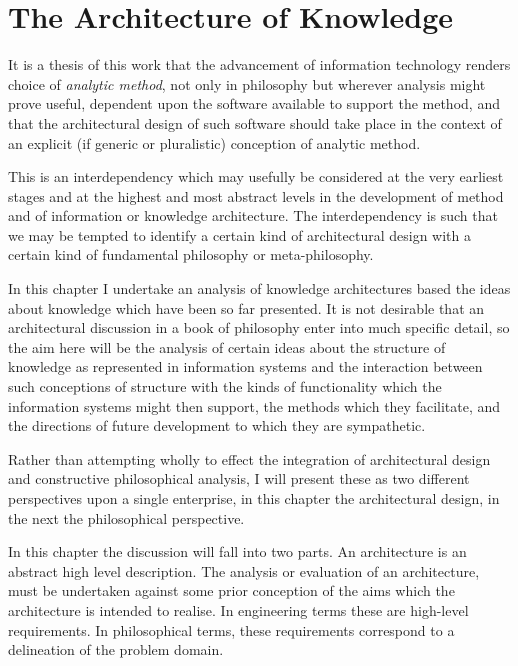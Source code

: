 
\chapter{The Architecture of Knowledge}\label{ArchitectureKnowledge}

It is a thesis of this work that the advancement of information
technology renders choice of \emph{analytic method}, not only in
philosophy but wherever analysis might prove useful, dependent upon
the software available to support the method, and that the
architectural design of such software should take place in the context
of an explicit (if generic or pluralistic) conception of analytic method.

This is an interdependency which may usefully be considered at the
very earliest stages and at the highest and most abstract levels in
the development of method and of information or knowledge architecture.
The interdependency is such that we may be tempted to identify a
certain kind of architectural design with a certain kind of fundamental
philosophy or meta-philosophy.

In this chapter I undertake an analysis of knowledge architectures based
the ideas about knowledge which have been so far presented.
It is not desirable that an architectural discussion in a book of
philosophy enter into much specific detail, so the aim here will be
the analysis of certain ideas about the structure of knowledge as
represented in information systems and the interaction between such
conceptions of structure with the kinds of functionality which the
information systems might then support, the methods which they
facilitate, and the directions of future development to which they are
sympathetic.

Rather than attempting wholly to effect the integration of architectural design
and constructive philosophical analysis,
I will present these as two different perspectives upon a single
enterprise, in this chapter the architectural design, in the next the
philosophical perspective.

In this chapter the discussion will fall into two parts.
An architecture is an abstract high level description.
The analysis or evaluation of an architecture, must be undertaken
against some prior conception of the aims which the architecture is
intended to realise.
In engineering terms these are high-level requirements.
In philosophical terms, these requirements correspond to a delineation
of the problem domain.

